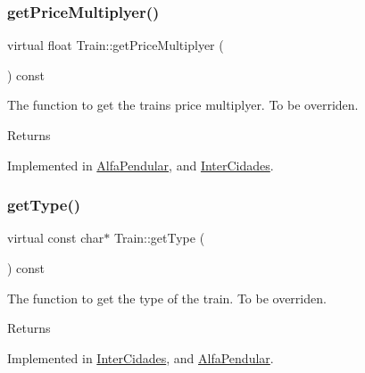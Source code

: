 \subsubsection{\texorpdfstring{get\+Price\+Multiplyer()}{getPriceMultiplyer()}}
{\footnotesize\ttfamily virtual float Train\+::get\+Price\+Multiplyer (\begin{DoxyParamCaption}{ }\end{DoxyParamCaption}) const\hspace{0.3cm}{\ttfamily [pure virtual]}}

The function to get the trains price multiplyer. To be overriden.

\begin{DoxyReturn}{Returns}

\end{DoxyReturn}


Implemented in \mbox{\hyperlink{classAlfaPendular_a12d09e5b65835ab7dcd3580ec8a41eee}{Alfa\+Pendular}}, and \mbox{\hyperlink{classInterCidades_ae48f10e5086edea5b9797ae12ab0867f}{Inter\+Cidades}}.

\mbox{\label{classTrain_ad2bd424547b5be4e3fa8e491f1ce790d}} 
\subsubsection{\texorpdfstring{get\+Type()}{getType()}}
{\footnotesize\ttfamily virtual const char$\ast$ Train\+::get\+Type (\begin{DoxyParamCaption}{ }\end{DoxyParamCaption}) const\hspace{0.3cm}{\ttfamily [pure virtual]}}

The function to get the type of the train. To be overriden.

\begin{DoxyReturn}{Returns}

\end{DoxyReturn}


Implemented in \mbox{\hyperlink{classInterCidades_a19eb37a1538d16247a7ba44e4a3c367b}{Inter\+Cidades}}, and \mbox{\hyperlink{classAlfaPendular_a8bae5eb768c157fd2151dfb0d0134962}{Alfa\+Pendular}}.

\mbox{\label{classTrain_a68d9748a7cb2d1c8c49450b1fb4ad894}} 
